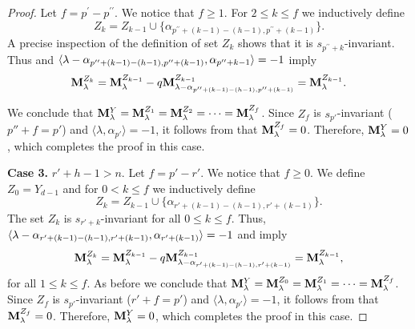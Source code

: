 \begin{proof}
\bigskip
Let $f=p^{\prime} - p^{\prime \prime}$. We notice that $f\geq 1$.  For $2\leq k \leq f$ we inductively define
\begin{equation}
    Z_k= Z_{k-1} \cup \{  \alpha_{ p^{\prime \prime}+(k-1)-(h-1) , p^{\prime \prime}+(k-1)}  \}. 
\end{equation}
A precise inspection of the definition of set  $Z_k$ shows that it is $s_{p^{\prime \prime}+k}$-invariant. Thus  and $\langle \lambda -\alpha_{ p^{\prime \prime}+(k-1)-(h-1) , p^{\prime \prime}+(k-1)} , \alpha_{p^{\prime \prime}+k-1} \rangle=-1$ imply
\begin{equation}
    \mathbf{M}_{\lambda}^{Z_k}  =   \mathbf{M}_{\lambda}^{Z_{k-1}}-q  \mathbf{M}_{\lambda -\alpha_{ p^{\prime \prime}+(k-1)-(h-1) , p^{\prime \prime}+(k-1)} }^{Z_{k-1}}   =  \mathbf{M}_{\lambda}^{Z_{k-1}}. 
\end{equation}

We conclude that $\mathbf{M}^{Y}_{\lambda} = \mathbf{M}^{Z_1}_{\lambda} = \mathbf{M}^{Z_2}_{\lambda} = \cdots = \mathbf{M}^{Z_f}_{\lambda}$. Since $Z_f$ is $s_{p'}$-invariant ($p'' + f = p'$) and $\langle \lambda, \alpha_{p'} \rangle = -1$, it follows from  that $\mathbf{M}^{Z_f}_{\lambda} = 0$. Therefore, $\mathbf{M}^{Y}_{\lambda} = 0$, which completes the proof in this case. 

\bigskip
\noindent \textbf{Case 3. }   $r'+h-1 > n$. 
Let $f=p'-r'$. We notice that $f\geq 0$.  We define $Z_0=Y_{d-1}$ and for $0<k\leq f$ we inductively define 
\begin{equation}
    Z_k = Z_{k-1} \cup \{  \alpha_{r'+(k-1)-(h-1), r'+(k-1)} \}.
\end{equation}
The set $Z_{k}$ is $s_{r'+k}$-invariant for all $0\leq k \leq f$. Thus,   $\langle \lambda -\alpha_{r'+(k-1)-(h-1), r'+(k-1)} , \alpha_{r'+(k-1)} \rangle  =-1 $ and   imply
\begin{equation}
    \mathbf{M}_{\lambda}^{Z_k}  =   \mathbf{M}_{\lambda}^{Z_{k-1}}-q  \mathbf{M}_{\lambda - \alpha_{r'+(k-1)-(h-1), r'+(k-1)}  }^{Z_{k-1}}   =  \mathbf{M}_{\lambda}^{Z_{k-1}}, 
\end{equation}
for all  $1\leq k\leq f$. As before we conclude that $\mathbf{M}^{Y}_{\lambda} = \mathbf{M}^{Z_0}_{\lambda} = \mathbf{M}^{Z_1}_{\lambda} = \cdots = \mathbf{M}^{Z_f}_{\lambda}$. Since $Z_f$ is $s_{p'}$-invariant ($r' + f = p'$) and $\langle \lambda, \alpha_{p'} \rangle = -1$, it follows from  that $\mathbf{M}^{Z_f}_{\lambda} = 0$. Therefore, $\mathbf{M}^{Y}_{\lambda} = 0$, which completes the proof in this case. 
\end{proof}


